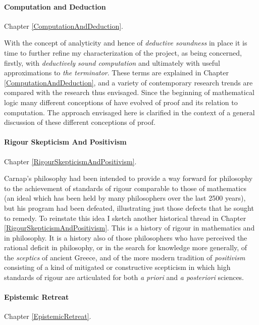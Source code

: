 \paragraph{Computation and Deduction}

Chapter \ref{ComputationAndDeduction}.

With the concept of analyticity and hence of \emph{deductive
  soundness} in place it is time to further refine my characterization
of the project, as being concerned, firstly, with \emph{deductively
  sound computation} and ultimately with useful approximations to
\emph{the terminator}. 
These terms are explained in Chapter
\ref{ComputationAndDeduction}, and a variety of
contemporary research trends are compared with the research thus envisaged.
Since the beginning of mathematical logic many different conceptions of
have evolved of proof and its relation to computation.
The approach envisaged here is clarified in the context of a general
discussion of these different conceptions of proof.

\paragraph{Rigour Skepticism And Positivism}

Chapter \ref{RigourSkepticismAndPositivism}.

Carnap's philosophy had been intended to provide a way forward for
philosophy to the achievement of standards of rigour comparable to
those of mathematics (an ideal which has been held by many
philosophers over the last 2500 years), but his program had been
defeated, illustrating  just those defects that he sought to remedy.
To reinstate this idea I sketch another historical thread in Chapter \ref{RigourSkepticismAndPositivism}.
This is a history of rigour in mathematics and in philosophy.
It is a history also of those philosophers who have perceived the
rational deficit in philosophy, or in the search for knowledge more
generally, of the \emph{sceptics} of ancient Greece, and of the more
modern tradition of \emph{positivism} consisting of a kind of
mitigated or constructive scepticism in which high standards of rigour
are articulated for both \emph{a priori} and \emph{a posteriori} sciences.

\paragraph{Epistemic Retreat}

Chapter \ref{EpistemicRetreat}.

